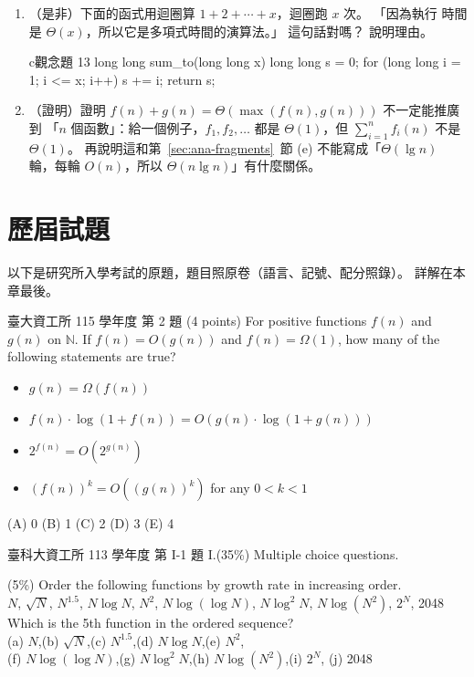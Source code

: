 \begin{enumerate}
\item （是非）下面的函式用迴圈算 $1 + 2 + \cdots + x$，迴圈跑 $x$ 次。 「因為執行
時間是 $\Theta(x)$，所以它是多項式時間的演算法。」 這句話對嗎？ 說明理由。
\begin{code}{c}{觀念題 13}
long long sum_to(long long x)
{
    long long s = 0;
    for (long long i = 1; i <= x; i++)
        s += i;
    return s;
}
\end{code}

\item （證明）證明 $f(n) + g(n) = \Theta(\max(f(n), g(n)))$ 不一定能推廣到
「$n$ 個函數」：給一個例子，$f_1, f_2, \ldots$ 都是 $\Theta(1)$，但
$\sum_{i=1}^{n} f_i(n)$ 不是 $\Theta(1)$。 再說明這和第~\ref{sec:ana-fragments}~節
(e) 不能寫成「$\Theta(\lg n)$ 輪，每輪 $O(n)$，所以 $\Theta(n \lg n)$」有什麼關係。
\end{enumerate}

\section{歷屆試題}
\label{sec:ana-pastexam}

以下是研究所入學考試的原題，題目照原卷（語言、記號、配分照錄）。 詳解在本章最後。

\begin{pastexam}[label={px:ana-1}]{臺大資工所 115 學年度 第 2 題}
(4 points) For positive functions $f(n)$ and $g(n)$ on $\mathbb{N}$. If $f(n)=O(g(n))$
and $f(n)=\Omega(1)$, how many of the following statements are true?
\begin{itemize}
\item $g(n)=\Omega(f(n))$
\item $f(n)\cdot\log(1+f(n))=O(g(n)\cdot\log(1+g(n)))$
\item $2^{f(n)}=O(2^{g(n)})$
\item $(f(n))^k=O((g(n))^k)$ for any $0<k<1$
\end{itemize}
(A) 0 \qquad (B) 1 \qquad (C) 2 \qquad (D) 3 \qquad (E) 4
\end{pastexam}

\begin{pastexam}[label={px:ana-2}]{臺科大資工所 113 學年度 第 I-1 題}
I.\quad (35\%) Multiple choice questions.

(5\%) Order the following functions by growth rate in increasing order.\\
$N$, $\sqrt{N}$, $N^{1.5}$, $N\log N$, $N^2$, $N\log(\log N)$, $N\log^2 N$,
$N\log(N^2)$, $2^N$, 2048\\
Which is the 5th function in the ordered sequence?\\
(a) $N$,\quad (b) $\sqrt{N}$,\quad (c) $N^{1.5}$,\quad (d) $N\log N$,\quad (e) $N^2$,\\
(f) $N\log(\log N)$,\quad (g) $N\log^2 N$,\quad (h) $N\log(N^2)$,\quad (i) $2^N$,\quad
(j) 2048
\end{pastexam}

